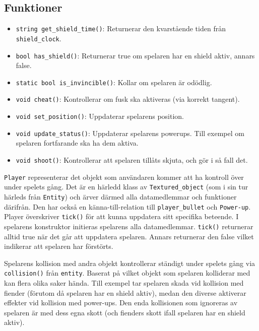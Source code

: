 \documentclass{TDP003mall}
\begin{document}
\subsection{Funktioner}
\begin{itemize}
\item \texttt{string get\_shield\_time()}: Returnerar den kvarstående tiden från \texttt{shield\_clock}.
\item \texttt{bool has\_shield()}: Returnerar true om spelaren har en shield aktiv, annars false.
\item \texttt{static bool is\_invincible()}: Kollar om spelaren är odödlig.
\item \texttt{void cheat()}: Kontrollerar om fusk ska aktiveras (via korrekt tangent).
\item \texttt{void set\_position()}: Uppdaterar spelarens position.
\item \texttt{void update\_status()}: Uppdaterar spelarens powerups. Till exempel om spelaren fortfarande ska ha dem aktiva.
\item \texttt{void shoot()}: Kontrollerar att spelaren tillåts skjuta, och gör i så fall det.
\end{itemize}

\texttt{Player} representerar det objekt som användaren kommer att ha kontroll över under spelets gång. 
Det är en härledd klass av \texttt{Textured\_object} (som i sin tur härleds från \texttt{Entity}) och ärver därmed alla datamedlemmar och funktioner därifrån. 
Den har också en känna-till-relation till \texttt{player\_bullet} och \texttt{Power-up}.
Player överskriver \texttt{tick()} för att kunna uppdatera sitt specifika beteende.
I spelarens konstruktor initieras spelarens alla datamedlemmar.
\texttt{tick()} returnerar alltid true när det går att uppdatera spelaren. Annars returnerar den false vilket indikerar att spelaren har förstörts.

Spelarens kollision med andra objekt kontrollerar ständigt under spelets gång via \texttt{collision()} från \texttt{entity}. 
Baserat på vilket objekt som spelaren kolliderar med kan flera olika saker hända.
Till exempel tar spelaren skada vid kollision med fiender (förutom då spelaren har en shield aktiv), medan den diverse aktiverar effekter vid kollision med power-ups. 
Den enda kollisionen som ignoreras av spelaren är med dess egna skott (och fienders skott ifall spelaren har en shield aktiv).
\end{document}
